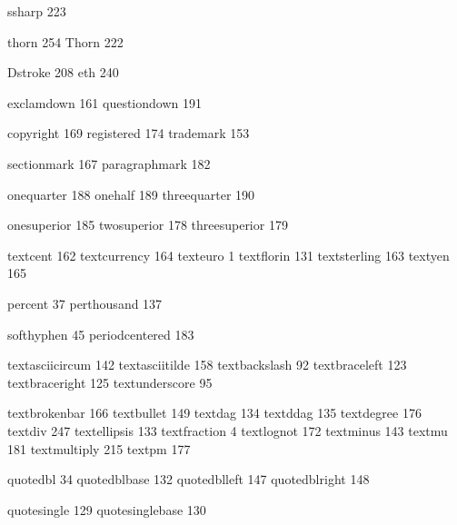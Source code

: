  ssharp           223

 thorn            254
 Thorn            222

 Dstroke          208 %
 eth              240

 exclamdown       161
 questiondown     191

 copyright        169
 registered       174
 trademark        153

 sectionmark      167
 paragraphmark    182

 onequarter       188
 onehalf          189
 threequarter     190

 onesuperior      185
 twosuperior      178
 threesuperior    179

 textcent         162 %
 textcurrency     164
 texteuro           1
 textflorin       131
 textsterling     163
 textyen          165

 percent           37
 perthousand      137

 softhyphen        45
 periodcentered   183

 textasciicircum  142
 textasciitilde   158
 textbackslash     92
 textbraceleft    123
 textbraceright   125
 textunderscore    95

 textbrokenbar    166
 textbullet       149
 textdag          134
 textddag         135
 textdegree       176
 textdiv          247
 textellipsis     133
 textfraction       4
 textlognot       172
 textminus        143
 textmu           181
 textmultiply     215
 textpm           177

 quotedbl          34
 quotedblbase     132
 quotedblleft     147
 quotedblright    148

 quotesingle      129
 quotesinglebase  130

